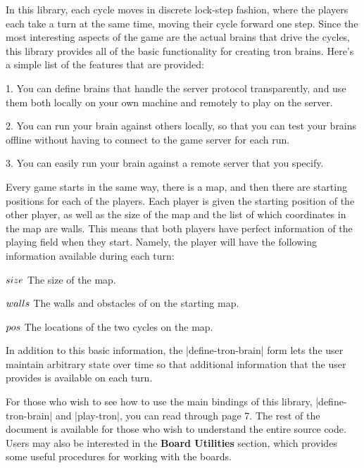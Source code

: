 In this library, each cycle moves in discrete lock-step fashion, 
where
the players each take a turn at the same time, moving their cycle
forward one step. Since the most interesting aspects of the game are
the actual brains that drive the cycles, this library provides all of
the basic functionality for creating tron brains.  Here's a simple
list of the features that are provided:

{\narrower\medskip
\item{1.} You can define brains that handle the server protocol 
transparently, and use them both locally on your own machine 
and remotely to play on the server.
\item{2.} You can run your brain against others locally, so that 
you can test your brains offline without having to connect to the 
game server for each run.
\item{3.} You can easily run your brain against a remote server 
that you specify.\par\medskip}

\noindent
Every game starts in the same way, there is a map, and then there are
starting positions for each of the players. Each player is given the
starting position of the other player, as well as the size of the map
and the list of which coordinates in the map are walls. This means
that both players have perfect information of the playing field when
they start. Namely, the player will have the following information 
available during each turn:

{\medskip\narrower\parindent=0.3in
\item{$\\{size}$} The size of the map.
\item{$\\{walls}$} The walls and obstacles of on the starting map.
\item{$\\{pos}$} The locations of the two cycles on the map.
\par\medskip}

\noindent In addition to this basic information, the |define-tron-brain| 
form lets the user maintain arbitrary state over time so that 
additional information that the user provides is available on each turn.

For those who wish to see how to use the main bindings of this 
library, |define-tron-brain| and |play-tron|, you can read through 
page 7. The rest of the document is available for those who wish to 
understand the entire source code. Users may also be interested in 
the {\bf Board Utilities} section, which provides some useful 
procedures for working with the boards.


